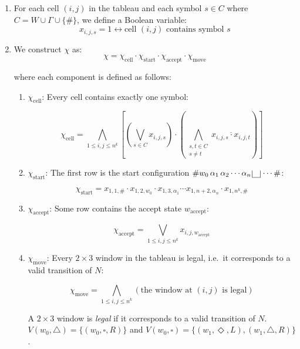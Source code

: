 \documentclass[12pt,a4paper,openany]{article}
\begin{document}
\begin{enumerate}
    \item For each cell $(i,j)$ in the tableau and each symbol $s \in C$ where $C = W \cup \Gamma \cup \{\#\}$, we define a Boolean variable:
    \[
    x_{i,j,s} = 1 \leftrightarrow \text{cell } (i,j) \text{ contains symbol } s
    \]

    \item We construct $\chi$ as:
    \[
    \chi = \chi_{\text{cell}} \cdot \chi_{\text{start}} \cdot \chi_{\text{accept}} \cdot \chi_{\text{move}}
    \]

    where each component is defined as follows:

    \begin{enumerate}
        \item $\chi_{\text{cell}}$: Every cell contains exactly one symbol:
        
        \[
        \chi_{\text{cell}} = \bigwedge_{1 \leq i,j \leq n^k} \left[ \left( \bigvee_{s \in C} x_{i,j,s} \right) \cdot \left( \bigwedge_{\substack{s,t \in C \\ s \neq t}} \overline{x_{i,j,s} \cdot x_{i,j,t}} \right) \right]
        \]

        \item $\chi_{\text{start}}$: The first row is the start configuration $\#w_0\, \alpha_1\, \alpha_2 \cdots \alpha_n \scalebox{2.5}{\textvisiblespace} \cdots \#$:
        
        \[
        \chi_{\text{start}} = x_{1,1,\#} \cdot x_{1,2,w_0} \cdot x_{1,3,\alpha_1} \cdots x_{1,n+2,\alpha_n} \cdot x_{1,n^k,\#}
        \]

        \item $\chi_{\text{accept}}$: Some row contains the accept state $w_{\text{accept}}$:
        
        \[
        \chi_{\text{accept}} = \bigvee_{1 \leq i,j \leq n^k} x_{i,j,w_{\text{accept}}}
        \]

        \item $\chi_{\text{move}}$: Every $2 \times 3$ window in the tableau is legal, i.e.\ it corresponds to a valid transition of $N$:
        
        \[
        \chi_{\text{move}} = \bigwedge_{1 \leq i,j \leq n^k} \left( \text{the window at } (i,j) \text{ is legal} \right)
        \]

        A $2 \times 3$ window is \emph{legal} if it corresponds to a valid transition of $N$. $V(w_0, \triangle) = \{(w_0, \square, R)\}$ and $V(w_0, \square) = \{(w_1, \Diamond, L), (w_1, \triangle, R)\}$.


\end{enumerate}
\end{enumerate}
\end{document}
